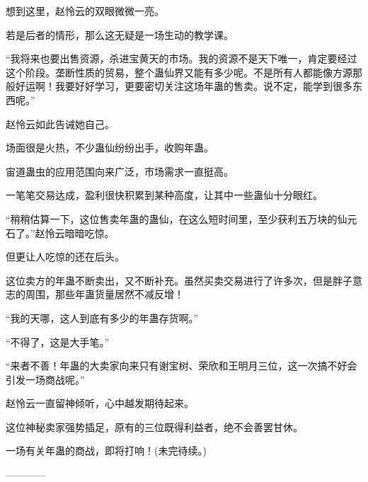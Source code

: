 \begin{this_body}
想到这里，赵怜云的双眼微微一亮。

若是后者的情形，那么这无疑是一场生动的教学课。

“我将来也要出售资源，杀进宝黄天的市场。我的资源不是天下唯一，肯定要经过这个阶段。垄断性质的贸易，整个蛊仙界又能有多少呢。不是所有人都能像方源那般好运啊！我要好好学习，更要密切关注这场年蛊的售卖。说不定，能学到很多东西呢。”

赵怜云如此告诫她自己。

场面很是火热，不少蛊仙纷纷出手，收购年蛊。

宙道蛊虫的应用范围向来广泛，市场需求一直挺高。

一笔笔交易达成，盈利很快积累到某种高度，让其中一些蛊仙十分眼红。

“稍稍估算一下，这位售卖年蛊的蛊仙，在这么短时间里，至少获利五万块的仙元石了。”赵怜云暗暗吃惊。

但更让人吃惊的还在后头。

这位卖方的年蛊不断卖出，又不断补充。虽然买卖交易进行了许多次，但是胖子意志的周围，那些年蛊货量居然不减反增！

“我的天哪，这人到底有多少的年蛊存货啊。”

“不得了，这是大手笔。”

“来者不善！年蛊的大卖家向来只有谢宝树、荣欣和王明月三位，这一次搞不好会引发一场商战呢。”

赵怜云一直留神倾听，心中越发期待起来。

这位神秘卖家强势插足，原有的三位既得利益者，绝不会善罢甘休。

一场有关年蛊的商战，即将打响！(未完待续。)

------------

\end{this_body}

